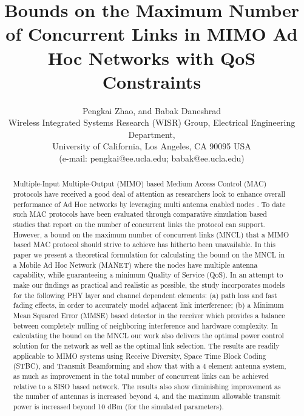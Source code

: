 \documentclass[draftcls,onecolumn,peerview,12pt]{IEEEtran}
\begin{document}
\title{Bounds on the Maximum Number of Concurrent Links in MIMO Ad Hoc
Networks with QoS Constraints}
\author{\normalsize{Pengkai Zhao, and Babak Daneshrad\\
        Wireless Integrated Systems Research (WISR) Group, Electrical Engineering Department,\\
        University of California, Los Angeles, CA 90095 USA\\
        (e-mail: pengkai@ee.ucla.edu; babak@ee.ucla.edu)}}





\maketitle


\begin{abstract}
Multiple-Input Multiple-Output (MIMO) based Medium Access Control
(MAC) protocols have received a good deal of attention as
researchers look to enhance overall performance of Ad Hoc networks
by leveraging multi antenna enabled nodes \cite{1_Fair_MAC,
2_nullhoc, 3_SPACEMAC2005, 4_Adaptive_Interference_Cancellation2005,
5_cross_layer}. To date such MAC protocols have been evaluated
through comparative simulation based studies that report on the
number of concurrent links the protocol can support. However, a
bound on the maximum number of concurrent links (MNCL) that a MIMO
based MAC protocol should strive to achieve has hitherto been
unavailable. In this paper we present a theoretical formulation for
calculating the bound on the MNCL in a Mobile Ad Hoc Network (MANET)
where the nodes have multiple antenna capability, while guaranteeing
a minimum Quality of Service (QoS). In an attempt to make our
findings as practical and realistic as possible, the study
incorporates models for the following PHY layer and channel
dependent elements: (a) path loss and fast fading effects, in order
to accurately model adjacent link interference; (b) a Minimum Mean
Squared Error (MMSE) based detector in the receiver which provides a
balance between completely nulling of neighboring interference and
hardware complexity. In calculating the bound on the MNCL our work
also delivers the optimal power control solution for the network as
well as the optimal link selection. The results are readily
applicable to MIMO systems using Receive Diversity, Space Time Block
Coding (STBC), and Transmit Beamforming and show that with a 4
element antenna system, as much as  improvement in the
total number of concurrent links can be achieved relative to a SISO
based network. The results also show diminishing improvement as the
number of antennas is increased beyond 4, and the maximum allowable
transmit power is increased beyond 10 dBm (for the simulated
parameters).
\end{abstract}
\end{document}
